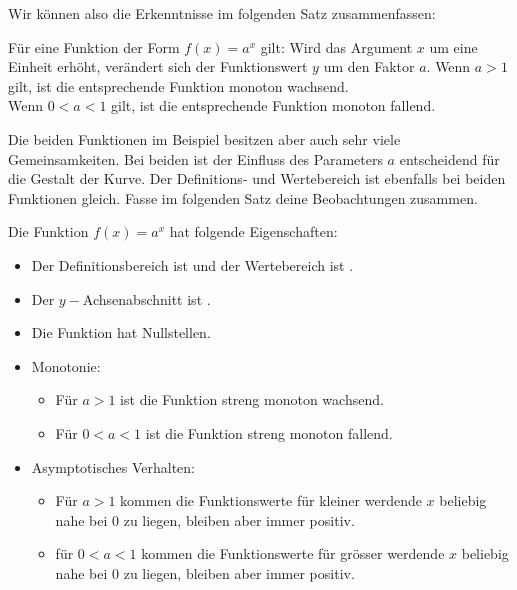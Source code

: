 \documentclass[11pt,oneside]{article}
\begin{document}
	Wir können also die Erkenntnisse im folgenden Satz zusammenfassen:
	\begin{satz}
		Für eine Funktion der Form $f(x)=a^x$ gilt: Wird das Argument $x$ um eine Einheit erhöht, verändert sich der Funktionswert $y$ um den Faktor $a$.\newline
		Wenn $a>1$ gilt, ist die entsprechende Funktion monoton wachsend.\\
		Wenn $0<a<1$ gilt, ist die entsprechende Funktion monoton fallend.
	\end{satz}
	Die beiden Funktionen im Beispiel besitzen aber auch sehr viele Gemeinsamkeiten. Bei beiden ist der Einfluss des Parameters $a$ entscheidend für die Gestalt der Kurve. Der Definitions- und Wertebereich ist ebenfalls bei beiden Funktionen gleich. Fasse im folgenden Satz deine Beobachtungen zusammen.
	\begin{satz}[Eigenschaften]
		Die Funktion $f(x)=a^x$ hat folgende Eigenschaften:
		\begin{itemize}
			\item Der Definitionsbereich ist  und der Wertebereich ist \gap{2}.
			\item Der $y-$Achsenabschnitt ist \gap{2}.
			\item Die Funktion hat  Nullstellen.
			\item Monotonie:
			\begin{itemize}
				\item Für $a>1$ ist die Funktion streng monoton wachsend.
				\item Für $0<a<1$ ist die Funktion streng monoton fallend.
				\end{itemize}
			\item Asymptotisches Verhalten:
			\begin{itemize}
				\item Für $a>1$ kommen die Funktionswerte für kleiner werdende $x$ beliebig nahe bei $0$ zu liegen, bleiben aber immer positiv.
				\item für $0<a<1$ kommen die Funktionswerte für grösser werdende $x$ beliebig nahe bei $0$ zu liegen, bleiben aber immer positiv.
			\end{itemize}
		\end{itemize}
	\end{satz}
\end{document}
